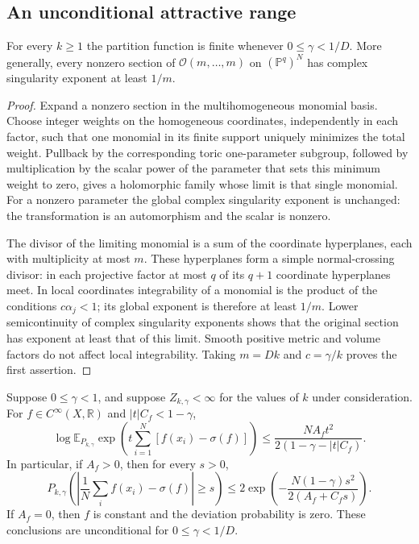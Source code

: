 \subsection{An unconditional attractive range}

\begin{lemma}
\label{ac:integrability}
For every $k\ge1$ the partition function is finite whenever
$0\le\gamma<1/D$.  More generally, every nonzero section of
$\mathcal O(m,\ldots,m)$ on $(\mathbb P^q)^N$ has complex
singularity exponent at least $1/m$.
\end{lemma}

\begin{proof}
Expand a nonzero section in the multihomogeneous monomial basis.
Choose integer weights on the homogeneous coordinates, independently
in each factor, such that one monomial in its finite support uniquely
minimizes the total weight.  Pullback by the corresponding toric
one-parameter subgroup, followed by multiplication by the scalar
power of the parameter that sets this minimum weight to zero, gives
a holomorphic family whose limit is that single monomial.  For a
nonzero parameter the global complex singularity exponent is unchanged:
the transformation is an automorphism and the scalar is nonzero.

The divisor of the limiting monomial is a sum of the coordinate
hyperplanes, each with multiplicity at most $m$.  These hyperplanes
form a simple normal-crossing divisor: in each projective factor at
most $q$ of its $q+1$ coordinate hyperplanes meet.  In local coordinates
integrability of a monomial is the product of the conditions
$c\alpha_j<1$; its global exponent is therefore at least $1/m$.
Lower semicontinuity of complex singularity exponents
\cite{geo_demailly_kollar2001} shows that the original section has
exponent at least that of this limit.  Smooth positive metric and
volume factors do not affect local integrability.  Taking $m=Dk$
and $c=\gamma/k$ proves the first assertion.
\end{proof}

\begin{theorem}
\label{ac:concentration}
Suppose $0\le\gamma<1$, and suppose $Z_{k,\gamma}<\infty$ for the
values of $k$ under consideration.  For $f\in C^\infty(X,\mathbb R)$
and $|t|C_f<1-\gamma$,
\begin{equation}
 \log\mathbb E_{P_{k,\gamma}}
       \exp\!\left(t\sum_{i=1}^N[f(x_i)-\sigma(f)]\right)
 \le\frac{NA_ft^2}{2(1-\gamma-|t|C_f)}.
 \label{ac:mgf}
\end{equation}
In particular, if $A_f>0$, then for every $s>0$,
\begin{equation}
 P_{k,\gamma}\!\left(
    \left|\frac1N\sum_i f(x_i)-\sigma(f)\right|\ge s\right)
 \le 2\exp\!\left(
    -\frac{N(1-\gamma)s^2}{2(A_f+C_fs)}\right).
 \label{ac:tail}
\end{equation}
If $A_f=0$, then $f$ is constant and the deviation probability is
zero.  These conclusions are unconditional for $0\le\gamma<1/D$.
\end{theorem}

